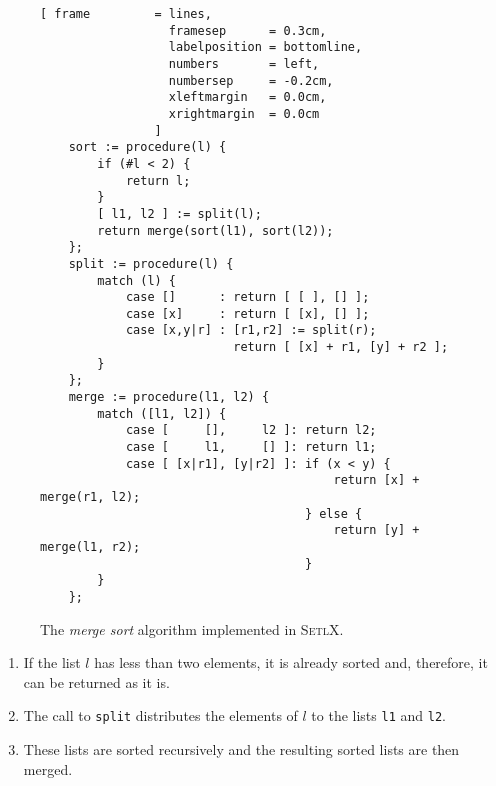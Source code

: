 \begin{figure}[!ht]
  \centering
\begin{Verbatim}[ frame         = lines, 
                  framesep      = 0.3cm, 
                  labelposition = bottomline,
                  numbers       = left,
                  numbersep     = -0.2cm,
                  xleftmargin   = 0.0cm,
                  xrightmargin  = 0.0cm
                ]
    sort := procedure(l) {
        if (#l < 2) {
            return l;
        }
        [ l1, l2 ] := split(l);
        return merge(sort(l1), sort(l2));
    };    
    split := procedure(l) {
        match (l) {
            case []      : return [ [ ], [] ];
            case [x]     : return [ [x], [] ];
            case [x,y|r] : [r1,r2] := split(r);
                           return [ [x] + r1, [y] + r2 ];
        }
    };
    merge := procedure(l1, l2) {
        match ([l1, l2]) {
            case [     [],     l2 ]: return l2;
            case [     l1,     [] ]: return l1;
            case [ [x|r1], [y|r2] ]: if (x < y) {
                                         return [x] + merge(r1, l2);
                                     } else {
                                         return [y] + merge(l1, r2);
                                     }
        }
    };
\end{Verbatim}
\vspace*{-0.3cm}
  \caption{The \emph{merge sort} algorithm implemented in \textsc{SetlX}.}
  \label{fig:merge-sort.stlx}
\end{figure}
\begin{enumerate}
\item If the list $l$ has less than two elements, it is already sorted and, therefore, it
      can be returned as it is.
\item The call to \texttt{split} distributes the elements of $l$ to the lists \texttt{l1} and \texttt{l2}.
\item These lists are sorted recursively and the resulting sorted lists are then merged.
\end{enumerate}

